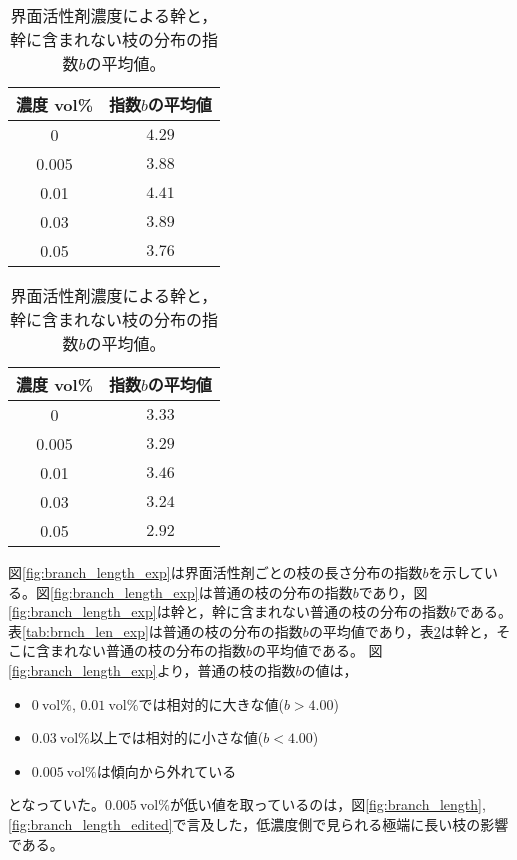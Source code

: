 \documentclass[autodetect-engine,dvi=dvipdfmx,a4paper,ja=standard,oneside,openany,11pt]{bxjsbook}
\begin{document}
\begin{table}[htbp]
  \begin{minipage}{0.45\textwidth}
    \centering
    \caption{界面活性剤濃度による普通の枝の分布の指数$b$の平均値。}
    \begin{tabular}{|c|c|}
      \hline
      濃度 vol\% & 指数$b$の平均値 \\ \hline\hline
      0        & $4.29$    \\ \hline
      0.005    & $3.88$    \\ \hline
      0.01     & $4.41$    \\ \hline
      0.03     & $3.89$    \\ \hline
      0.05     & $3.76$    \\
      \hline
    \end{tabular}
    \label{tab:brnch_len_exp}
  \end{minipage}
  \hfill
  \begin{minipage}{0.45\textwidth}
    \centering
    \caption{界面活性剤濃度による幹と，幹に含まれない枝の分布の指数$b$の平均値。}
    \begin{tabular}{|c|c|}
      \hline
      濃度 vol\% & 指数$b$の平均値 \\ \hline\hline
      0        & $3.33$    \\ \hline
      0.005    & $3.29$    \\ \hline
      0.01     & $3.46$    \\ \hline
      0.03     & $3.24$    \\ \hline
      0.05     & $2.92$    \\
      \hline
    \end{tabular}
    \label{tab:branch_len_exp_edited}
  \end{minipage}
\end{table}

図\ref{fig:branch_length_exp}は界面活性剤ごとの枝の長さ分布の指数$b$を示している。図\ref{fig:branch_length_exp}は普通の枝の分布の指数$b$であり，図\ref{fig:branch_length_exp}は幹と，幹に含まれない普通の枝の分布の指数$b$である。表\ref{tab:brnch_len_exp}は普通の枝の分布の指数$b$の平均値であり，表\ref{tab:branch_len_exp_edited}は幹と，そこに含まれない普通の枝の分布の指数$b$の平均値である。
図\ref{fig:branch_length_exp}より，普通の枝の指数$b$の値は，
\begin{itemize}
  \item $\SI{0}{\mathrm{vol}\%}$, $\SI{0.01}{\mathrm{vol}\%}$では相対的に大きな値($b>4.00$)
  \item $\SI{0.03}{\mathrm{vol}\%}$以上では相対的に小さな値($b<4.00$)
  \item $\SI{0.005}{\mathrm{vol}\%}$は傾向から外れている
\end{itemize}
となっていた。$\SI{0.005}{\mathrm{vol}\%}$が低い値を取っているのは，図\ref{fig:branch_length},\ref{fig:branch_length_edited}で言及した，低濃度側で見られる極端に長い枝の影響である。
\end{document}
